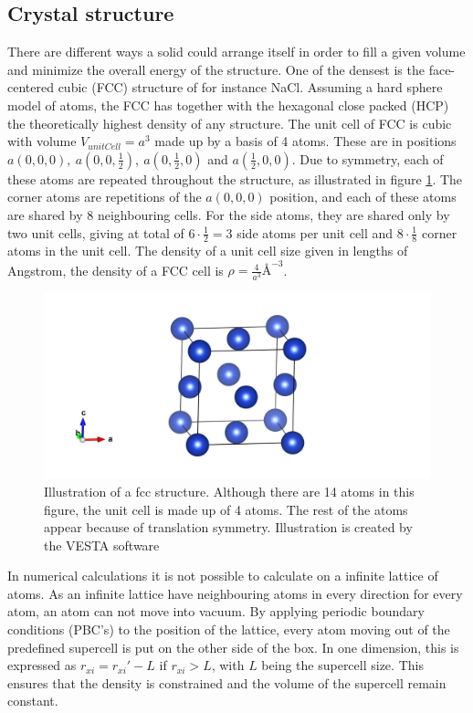 \subsection{Crystal structure}

There are different ways a solid could arrange itself in order to fill a given volume and minimize the overall energy of the structure. One of the densest is the face-centered cubic (FCC) structure of for instance NaCl. Assuming a hard sphere model of atoms, the FCC has together with the hexagonal close packed (HCP) the theoretically highest density of any structure. The unit cell of FCC is cubic with volume $ V_{unitCell} = a^3 $ made up by a basis of 4 atoms. These are in positions $ a(0,0,0), \ a(0,0,\frac{1}{2}),\ a(0,\frac{1}{2}, 0)   $ and $ a(\frac{1}{2}, 0,0) $. Due to symmetry, each of these atoms are repeated throughout the structure, as illustrated in figure \ref{fig:fcc}. The corner atoms are  repetitions of the $ a(0,0,0)$ position, and each of these atoms are shared by 8 neighbouring cells. For the side atoms, they are shared only by two unit cells, giving at total of $ 6\cdot \frac{1}{2}=3 $ side atoms per unit cell and $ 8\cdot  \frac{1}{8}$ corner atoms in the unit cell. The density of a unit cell size given in lengths of Angstrom, the density of a FCC cell  is $\rho=  \frac{4}{a^3} \text{\AA}^{-3}$. 

\begin{figure}[H]
	\centering
	\includegraphics[width=0.7\linewidth]{../figures/fcc.jpg}
	\caption{Illustration of a fcc structure. Although there are 14 atoms in this figure, the unit cell is made up of 4 atoms. The rest of the atoms appear because of translation symmetry. Illustration is created by the VESTA software \cite{VESTA}}
	\label{fig:fcc}
\end{figure}

In numerical calculations it is not possible to calculate on a infinite lattice of atoms. As an infinite lattice have neighbouring atoms in every direction for every atom, an atom can not move into vacuum. By applying periodic boundary conditions (PBC's) to the position of the lattice, every atom moving out of the predefined supercell is put on the other side of the box. In one dimension, this is expressed as $ r_{xi} = r_{xi}' - L $ if $ r_{xi} >L $, with $ L $ being the supercell size. This ensures that the density is constrained and the volume of the supercell remain constant. 

